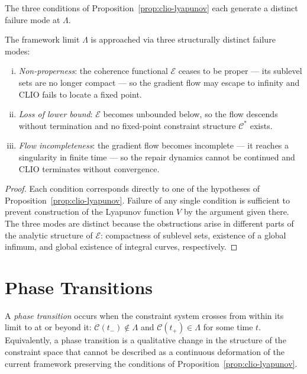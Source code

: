 \documentclass[11pt,openany]{book}
\begin{document}
The three conditions of Proposition~\ref{prop:clio-lyapunov}
each generate a distinct failure mode at $\Lambda$.

\begin{proposition}
\label{prop:three-modes}
The framework limit $\Lambda$ is approached via three
structurally distinct failure modes:
\begin{enumerate}[(i)]
  \item \emph{Non-properness}: the coherence functional
    $\mathcal{E}$ ceases to be proper --- its sublevel sets
    are no longer compact --- so the gradient flow may
    escape to infinity and CLIO fails to locate a fixed
    point.
  \item \emph{Loss of lower bound}: $\mathcal{E}$ becomes
    unbounded below, so the flow descends without
    termination and no fixed-point constraint structure
    $\mathcal{C}^*$ exists.
  \item \emph{Flow incompleteness}: the gradient flow
    becomes incomplete --- it reaches a singularity in
    finite time --- so the repair dynamics cannot be
    continued and CLIO terminates without convergence.
\end{enumerate}
\end{proposition}

\begin{proof}
Each condition corresponds directly to one of the
hypotheses of Proposition~\ref{prop:clio-lyapunov}.
Failure of any single condition is sufficient to prevent
construction of the Lyapunov function $V$ by the argument
given there.  The three modes are distinct because the
obstructions arise in different parts of the analytic
structure of $\mathcal{E}$: compactness of sublevel sets,
existence of a global infimum, and global existence of
integral curves, respectively.
\end{proof}

\section{Phase Transitions}
\label{sec:phase-transitions}

\begin{definition}
\label{def:phase-transition}
A \emph{phase transition} occurs when the constraint
system crosses from within its limit to at or beyond it:
$\mathcal{C}(t_-) \notin \Lambda$ and $\mathcal{C}(t_+)
\in \Lambda$ for some time $t$.  Equivalently, a phase
transition is a qualitative change in the structure of the
constraint space that cannot be described as a continuous
deformation of the current framework preserving the
conditions of Proposition~\ref{prop:clio-lyapunov}.
\end{definition}
\end{document}
